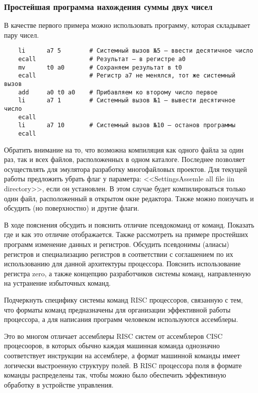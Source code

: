 \subsubsection{Простейшая программа нахождения суммы двух чисел}
В качестве первого примера можно использовать программу, которая складывает пару чисел.
\begin{verbatim}
    li      a7 5        # Системный вызов №5 — ввести десятичное число
    ecall               # Результат — в регистре a0
    mv      t0 a0       # Сохраняем результат в t0
    ecall               # Регистр a7 не менялся, тот же системный вызов
    add     a0 t0 a0    # Прибавляем ко второму число первое
    li      a7 1        # Системный вызов №1 — вывести десятичное число
    ecall
    li      a7 10       # Системный вызов №10 — останов программы
    ecall
\end{verbatim}


Обратить внимание на то, что возможна компиляция как одного файла за один раз, так и всех файлов, расположенных в одном каталоге. Последнее позволяет осуществлять для эмулятора разработку многофайловых проектов. Для текущей работы предложить убрать флаг у параметра: <<SettingsAssemle all file iin directory>>, если он установлен. В этом случае будет компилироваться только один файл, расположенный в открытом окне редактора. Также можно поизучать и обсудить (но поверхностно) и другие флаги.

В ходе пояснения обсудить и пояснить отличие псевдокоманд от команд. Показать где и как это отличие отображается. Также рассмотреть на примере простейших программ изменение данных и регистров. Обсудить псевдонимы (алиасы) регистров и специализацию регистров в соответствии с соглашением по их использованию для данной архитектуры процессора. Пояснить использование регистра zero, а также концепцию разработчиков системы команд, направленную на устранение избыточных команд.

Подчеркнуть специфику системы команд RISC процессоров, связанную с тем, что форматы команд предназначены для организации эффективной работы процессора, а для написания программ человеком используются ассемблеры.

Это во многом отличает ассемблеры RISC систем от ассемблеров CISC процесооров, в которых обычно каждая машинная команда однозначно соответствует инструкции на ассемблере, а формат машинной команды имеет логически выстроенную структуру полей. В RISC процессора поля в формате команды распределены так, чтобы можно было обеспечить эффективную обработку в устройстве управления.

